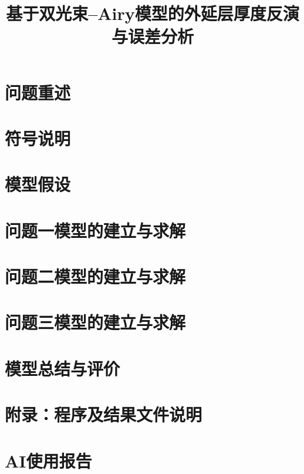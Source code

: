 \documentclass[withoutpreface]{cumcmthesis}
\title{基于双光束–Airy模型的外延层厚度反演与误差分析}
\begin{document}
\maketitle

\begin{abstract}

\end{abstract}

\setcounter{tocdepth}{2}

\clearpage
{}
\setcounter{page}{1}

\section{问题重述}


\section{符号说明}


\section{模型假设}


\section{问题一模型的建立与求解}


\section{问题二模型的建立与求解}


\section{问题三模型的建立与求解}


\section{模型总结与评价}


\clearpage


\clearpage
\section*{附录：程序及结果文件说明}


\clearpage
\section*{AI使用报告}

\end{document}
